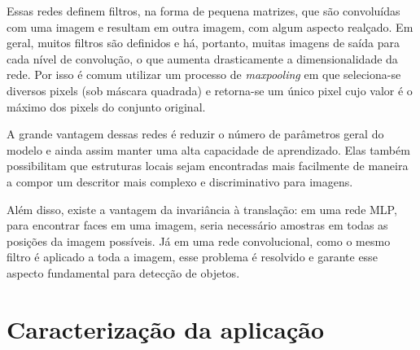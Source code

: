 Essas redes definem filtros, na forma de pequena matrizes, que são convoluídas com uma imagem e resultam em outra imagem, com algum aspecto realçado. Em geral, muitos filtros são definidos e há, portanto, muitas imagens de saída para cada nível de convolução, o que aumenta drasticamente a dimensionalidade da rede. Por isso é comum utilizar um processo de \textit{maxpooling} em que seleciona-se diversos pixels (sob máscara quadrada) e retorna-se um único pixel cujo valor é o máximo dos pixels do conjunto original.

A grande vantagem dessas redes é reduzir o número de parâmetros geral do modelo e ainda assim manter uma alta capacidade de aprendizado. Elas também possibilitam que estruturas locais sejam encontradas mais facilmente de maneira a compor um descritor mais complexo e discriminativo para imagens.

Além disso, existe a vantagem da invariância à translação: em uma rede MLP, para encontrar faces em uma imagem, seria necessário amostras em todas as posições da imagem possíveis. Já em uma rede convolucional, como o mesmo filtro é aplicado a toda a imagem, esse problema é resolvido e garante esse aspecto fundamental para detecção de objetos.


\section{Caracterização da aplicação}


